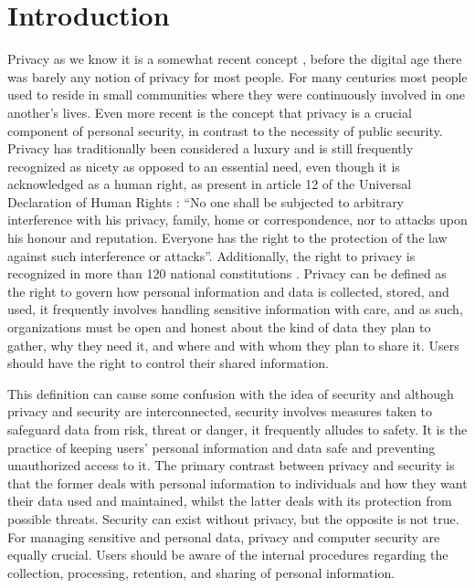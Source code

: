 %
%
\section{Introduction} \label{introduction}

Privacy as we know it is a somewhat recent concept \cite{vincent2016privacy, moore2017privacy},
before the digital age there was barely any notion of privacy for most
people. For many centuries most people used to reside in small communities
where they were continuously involved in one another's lives. Even more
recent is the concept that privacy is a crucial component of personal security,
in contrast to the necessity of public security. Privacy has traditionally been
considered a luxury and is still frequently recognized as nicety as opposed to an
essential need, even though it is acknowledged as a human right, as present
in article 12 of the Universal Declaration of Human Rights \cite{RooseveltUniversal}:
``No one shall be subjected to arbitrary interference with his privacy,
family, home or correspondence, nor to attacks upon his honour and reputation.
Everyone has the right to the protection of the law against such interference
or attacks''. Additionally, the right to privacy is recognized in more than 120 national
constitutions \cite{constitute2023constitutions}. Privacy can be defined \cite{InternationalWhat, SpiekermannEngineering}
as the right to govern how personal information and data is collected, stored,
and used, it frequently involves handling sensitive information with care,
and as such, organizations must be open and honest about the kind of data
they plan to gather, why they need it, and where and with whom they plan
to share it. Users should have the right to control their shared information.

This definition can cause some confusion with the idea of security \cite{HIVDifference}
and although privacy and security are interconnected, security involves
measures taken to safeguard data from risk, threat or danger, it frequently
alludes to safety. It is the practice of keeping users' personal information
and data safe and preventing unauthorized access to it. The primary contrast
between privacy and security is that the former deals with personal information
to individuals and how they want their data used and maintained, whilst
the latter deals with its protection from possible threats. Security can
exist without privacy, but the opposite is not true. For managing sensitive
and personal data, privacy and computer security are equally crucial. Users
should be aware of the internal procedures regarding the collection, processing,
retention, and sharing of personal information.

